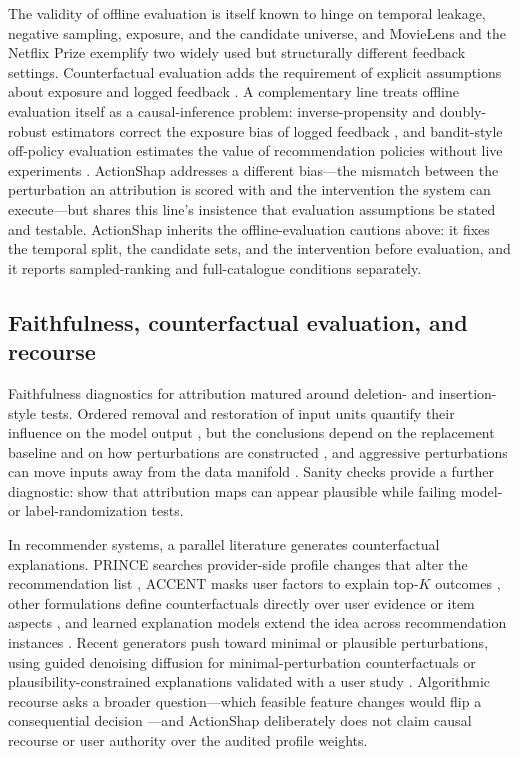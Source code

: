 \documentclass[a4paper,fleqn,doubleblind]{cas-sc}
\begin{document}
The validity of offline evaluation is itself known to hinge on temporal leakage, negative sampling, exposure, and the candidate universe, and MovieLens \citep{harper2016} and the Netflix Prize \citep{bennett2007} exemplify two widely used but structurally different feedback settings. Counterfactual evaluation adds the requirement of explicit assumptions about exposure and logged feedback \citep{saito2021}. A complementary line treats offline evaluation itself as a causal-inference problem: inverse-propensity and doubly-robust estimators correct the exposure bias of logged feedback \citep{schnabel2016debias,joachims2017unbiased,saito2020ips}, and bandit-style off-policy evaluation estimates the value of recommendation policies without live experiments \citep{li2011linucb}. ActionShap addresses a different bias---the mismatch between the perturbation an attribution is scored with and the intervention the system can execute---but shares this line's insistence that evaluation assumptions be stated and testable. ActionShap inherits the offline-evaluation cautions above: it fixes the temporal split, the candidate sets, and the intervention before evaluation, and it reports sampled-ranking and full-catalogue conditions separately.

\subsection{Faithfulness, counterfactual evaluation, and recourse}
Faithfulness diagnostics for attribution matured around deletion- and insertion-style tests. Ordered removal and restoration of input units quantify their influence on the model output \citep{petsiuk2018rise}, but the conclusions depend on the replacement baseline and on how perturbations are constructed \citep{fong2017meaningful}, and aggressive perturbations can move inputs away from the data manifold \citep{hooker2019}. Sanity checks provide a further diagnostic: \citet{adebayo2018} show that attribution maps can appear plausible while failing model- or label-randomization tests.

In recommender systems, a parallel literature generates counterfactual explanations. PRINCE searches provider-side profile changes that alter the recommendation list \citep{ghazimatin2020}, ACCENT masks user factors to explain top-$K$ outcomes \citep{tran2021}, other formulations define counterfactuals directly over user evidence or item aspects \citep{tan2021,barkan2024}, and learned explanation models extend the idea across recommendation instances \citep{gurevitch2025}. Recent generators push toward minimal or plausible perturbations, using guided denoising diffusion for minimal-perturbation counterfactuals \citep{mohammadi2026sigir} or plausibility-constrained explanations validated with a user study \citep{cerny2025plausible}. Algorithmic recourse asks a broader question---which feasible feature changes would flip a consequential decision \citep{wachter2017,karimi2021}---and ActionShap deliberately does not claim causal recourse or user authority over the audited profile weights.
\end{document}
